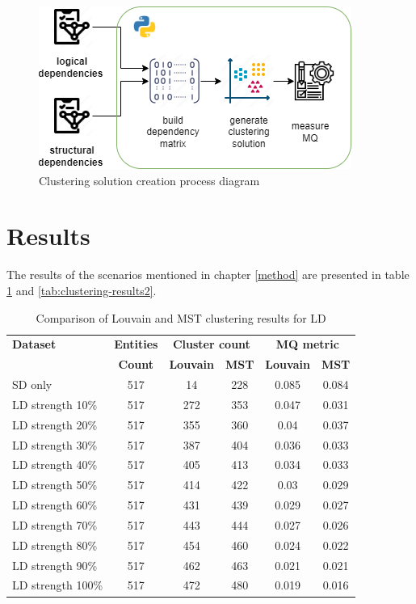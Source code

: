 \documentclass[conference]{IEEEtran}
\begin{document}
\begin{figure}
\centering
\includegraphics[width=\columnwidth]{clustering-generation.png}
\caption{Clustering solution creation process diagram}
\label{fig:clustering-gen}
\centering
\end{figure}


\section{Results}

The results of the scenarios mentioned in chapter \ref{method} are presented in table \ref{tab:clustering-results1} and \ref{tab:clustering-results2}.

\begin{table}[htbp]
  \centering
  \caption{Comparison of Louvain and MST clustering results for LD}
  \label{tab:clustering-results1}
  \begin{tabular}{lc|cc|cc}
    \toprule
    \textbf{Dataset} & \textbf{Entities} & \multicolumn{2}{c}{\textbf{Cluster count}} & \multicolumn{2}{c}{\textbf{MQ metric}} \\
    & \textbf{Count} & \textbf{Louvain} & \textbf{MST} & \textbf{Louvain} & \textbf{MST} \\
    \midrule
    SD only & 517 & 14 & 228 & 0.085 & 0.084 \\
    LD strength 10\% & 517 & 272 & 353 & 0.047 & 0.031 \\
    LD strength 20\% & 517 & 355 & 360 & 0.04 & 0.037 \\
    LD strength 30\% & 517 & 387 & 404 & 0.036 & 0.033 \\
    LD strength 40\% & 517 & 405 & 413 & 0.034 & 0.033 \\
    LD strength 50\% & 517 & 414 & 422 & 0.03 & 0.029 \\
    LD strength 60\% & 517 & 431 & 439 & 0.029 & 0.027 \\
    LD strength 70\% & 517 & 443 & 444 & 0.027 & 0.026 \\
    LD strength 80\% & 517 & 454 & 460 & 0.024 & 0.022 \\
    LD strength 90\% & 517 & 462 & 463 & 0.021 & 0.021 \\
    LD strength 100\% & 517 & 472 & 480 & 0.019 & 0.016 \\
    \bottomrule
  \end{tabular}
\end{table}
\end{document}

